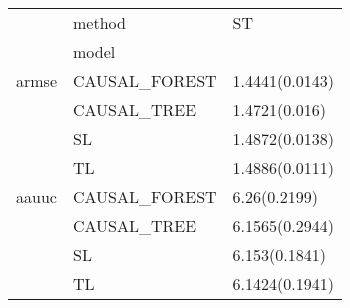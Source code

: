 \begin{tabular}{lll}
\toprule
      & method &              ST \\
{} & model &                 \\
\midrule
armse & CAUSAL\_FOREST &  1.4441(0.0143) \\
      & CAUSAL\_TREE &   1.4721(0.016) \\
      & SL &  1.4872(0.0138) \\
      & TL &  1.4886(0.0111) \\
aauuc & CAUSAL\_FOREST &    6.26(0.2199) \\
      & CAUSAL\_TREE &  6.1565(0.2944) \\
      & SL &   6.153(0.1841) \\
      & TL &  6.1424(0.1941) \\
\bottomrule
\end{tabular}
